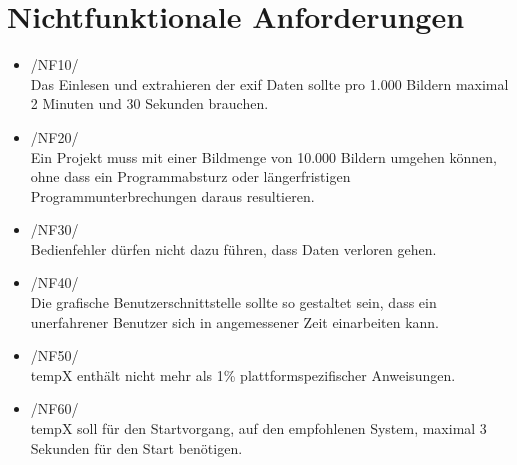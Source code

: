 \section{Nichtfunktionale Anforderungen}

\begin{itemize}
	\item /NF10/\\Das Einlesen und extrahieren der \gls{exif} Daten sollte pro 1.000 Bildern maximal 2 Minuten und 30 Sekunden brauchen.
	\item /NF20/\\Ein Projekt muss mit einer Bildmenge von 10.000 Bildern umgehen können, ohne dass ein Programmabsturz oder längerfristigen Programmunterbrechungen daraus resultieren.
	\item /NF30/\\Bedienfehler dürfen nicht dazu führen, dass Daten verloren gehen.
	\item /NF40/\\Die grafische Benutzerschnittstelle sollte so gestaltet sein, dass ein unerfahrener Benutzer sich in angemessener Zeit einarbeiten kann.
	\item /NF50/\\ \gls{tempX} enthält nicht mehr als 1\% plattformspezifischer Anweisungen.	
	\item /NF60/\\ \gls{tempX} soll für den Startvorgang, auf den empfohlenen System, maximal 3 Sekunden für den Start benötigen.
\end{itemize}
